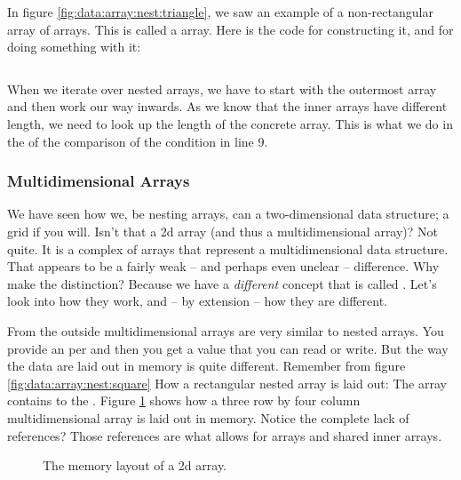 In figure \ref{fig:data:array:nest:triangle}, we saw an example of a non-rectangular array of arrays. This is called a  array. Here is the code for constructing it, and for doing something with it:

\inputminted[linenos]{csharp}{../src/csharp/primdata/array_nest_jagged/Program.cs}

When we iterate over nested arrays, we have to start with the outermost array and then work our way inwards.
As we know that the inner arrays have different length, we need to look up the length of the concrete array. This is what we do in the  of the comparison of the condition in line 9.

\subsubsection{Multidimensional Arrays}

We have seen how we, be nesting arrays, can a two-dimensional data structure; a grid if you will. Isn't that a 2d array (and thus a multidimensional array)? Not quite. It is a complex of arrays that represent a multidimensional data structure. That appears to be a fairly weak -- and perhaps even unclear -- difference. Why make the distinction? Because we have a \textsl{different} concept that is called . Let's look into how they work, and -- by extension -- how they are different.

From the outside multidimensional arrays are very similar to nested arrays. You provide an  per  and then you get a value that you can read or write. But the way the data are laid out in memory is quite different. Remember from figure \ref{fig:data:array:nest:square} How a rectangular nested array is laid out: The  array contains  to the . Figure \ref{fig:data:IIDarray:layout} shows how a three row by four column multidimensional array is laid out in memory. Notice the complete lack of references? Those references are what allows for   arrays and shared inner arrays.

\begin{figure}[tbp]
  
  \caption{The memory layout of a 2d array.}
  \label{fig:data:IIDarray:layout}
\end{figure}

